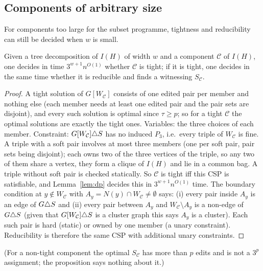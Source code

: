 \subsection{Components of arbitrary size}
For components too large for the subset programme, tightness and reducibility can still be decided when $w$ is small.
\begin{proposition}\label{prop:two}
Given a tree decomposition of $I(H)$ of width $w$ and a component $\mathcal C$ of $I(H)$, one decides in time $3^{w+1}n^{O(1)}$ whether $\mathcal C$ is tight; if it is tight, one decides in the same time whether it is reducible and finds a witnessing $S_{\mathcal C}$.
\end{proposition}
\begin{proof}
A tight solution of $G[W_{\mathcal C}]$ consists of one edited pair per member and nothing else (each member needs at least one edited pair and the pair sets are disjoint), and every such solution is optimal since $\tau\ge p$; so for a tight $\mathcal C$ the optimal solutions are exactly the tight ones. Variables: the three choices of each member. Constraint: $G[W_{\mathcal C}]\triangle S$ has no induced $P_3$, i.e.\ every triple of $W_{\mathcal C}$ is fine. A triple with a soft pair involves at most three members (one per soft pair, pair sets being disjoint); each owns two of the three vertices of the triple, so any two of them share a vertex, they form a clique of $I(H)$ and lie in a common bag. A triple without soft pair is checked statically. So $\mathcal C$ is tight iff this CSP is satisfiable, and Lemma~\ref{lem:dp} decides this in $3^{w+1}n^{O(1)}$ time. The boundary condition at $y\notin W_{\mathcal C}$ with $A_y=N(y)\cap W_{\mathcal C}\ne\emptyset$ says: (i) every pair inside $A_y$ is an edge of $G\triangle S$ and (ii) every pair between $A_y$ and $W_{\mathcal C}\setminus A_y$ is a non-edge of $G\triangle S$ (given that $G[W_{\mathcal C}]\triangle S$ is a cluster graph this says $A_y$ is a cluster). Each such pair is hard (static) or owned by one member (a unary constraint). Reducibility is therefore the same CSP with additional unary constraints.
\end{proof}
(For a non-tight component the optimal $S_{\mathcal C}$ has more than $p$ edits and is not a $3^p$ assignment; the proposition says nothing about it.)

